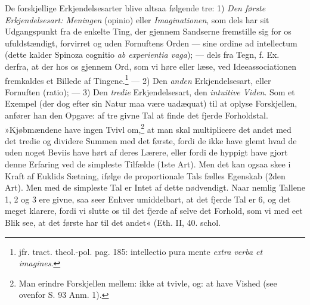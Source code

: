 \documentclass[12pt,a4paper]{book}
\begin{document}
De forskjellige Erkjendelsesarter blive altsaa følgende tre: 1)
\emph{Den første Erkjendelsesart: Meningen} (opinio) eller
\emph{Imaginationen}, som dels har sit Udgangspunkt fra de enkelte
Ting, der gjennem Sandserne fremstille sig for os ufuldstændigt,
forvirret og uden Fornuftens Orden --- sine ordine ad intellectum
(dette kalder Spinoza cognitio \emph{ab experientia vaga}); --- dels fra
Tegn, f. Ex. derfra, at der hos os gjennem Ord, som vi høre eller
læse, ved Ideeassociationen fremkaldes et Billede af
Tingene.\footnote{jfr. tract. theol.-pol. pag. 185: intellectio
pura mente \emph{extra verba et imagines}.} --- 2) Den \emph{anden}
Erkjendelsesart, eller Fornuften (ratio); --- 3) Den \emph{tredie}
Erkjendelsesart, den \emph{intuitive Viden}. Som et Exempel (der dog
efter sin Natur maa være uadæquat) til at oplyse Forskjellen, anfører
han den Opgave: af tre givne Tal at finde det fjerde Forholdstal.
»Kjøbmændene have ingen Tvivl om,\footnote{Man erindre Forskjellen
mellem: ikke at tvivle, og: at have Vished (see ovenfor S. 93 Anm.
1).} at man skal multiplicere det andet med det tredie og dividere
Summen med det første, fordi de ikke have glemt hvad de uden noget
Beviis have hørt af deres Lærere, eller fordi de hyppigt have gjort
denne Erfaring ved de simpleste Tilfælde (1ste Art). Men det kan
ogsaa skee i Kraft af Euklids Sætning, ifølge de proportionale Tals
fælles Egenskab (2den Art). Men med de simpleste Tal er Intet af
dette nødvendigt. Naar nemlig Tallene 1, 2 og 3 ere givne, saa seer
Enhver umiddelbart, at det fjerde Tal er 6, og det meget klarere,
fordi vi slutte os til det fjerde af selve det Forhold, som vi med
eet Blik see, at det første har til det andet« (Eth. II, 40. schol.
\end{document}
